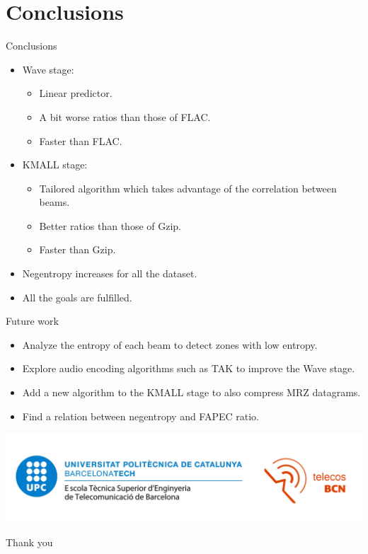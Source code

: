 \documentclass[usenames,dvipsnames]{beamer}
\begin{document}
\section{Conclusions}
\begin{frame}{Conclusions}
\begin{itemize}
	\item Wave stage:
	\begin{itemize}
		\item Linear predictor.
		\item A bit worse ratios than those of FLAC.
		\item Faster than FLAC.
	\end{itemize}
	
	\item KMALL stage:
	\begin{itemize}
		\item Tailored algorithm which takes advantage of the correlation between beams.
		\item Better ratios than those of Gzip.
		\item Faster than Gzip.
	\end{itemize}
	\item Negentropy increases for all the dataset.
	\item All the goals are fulfilled.
\end{itemize}
\end{frame}

\begin{frame}{Future work}
\begin{itemize}
	\item Analyze the entropy of each beam to detect zones with low entropy.
	\item Explore audio encoding algorithms such as TAK to improve the Wave stage.
	\item Add a new algorithm to the KMALL stage to also compress MRZ datagrams.
	\item Find a relation between negentropy and FAPEC ratio.
\end{itemize}
\end{frame}

\begin{frame}{}
\centering
\vspace{-5em}
\includegraphics[scale=0.18]{graphics/logo.png}
\vspace{3em}

\huge
Thank you
\normalsize
\end{frame}
\end{document}
